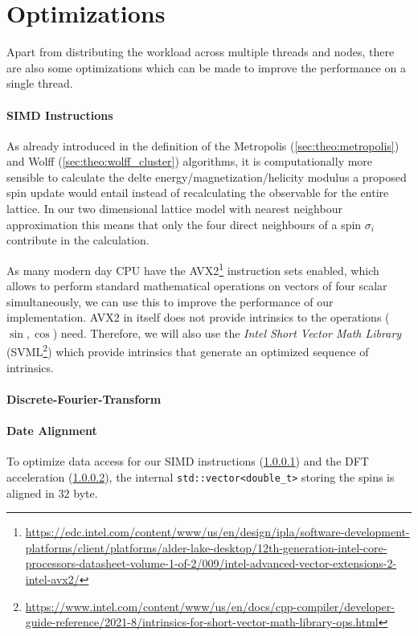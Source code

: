 \section{Optimizations}\label{sec:impl:optimizations}
	Apart from distributing the workload across multiple threads and nodes, there are also some optimizations which can be made to improve the performance on a single thread.
	
	\paragraph{SIMD Instructions}\label{sec:impl:optimizations:simd}
		As already introduced in the definition of the Metropolis (\cref{sec:theo:metropolis}) and Wolff (\cref{sec:theo:wolff_cluster}) algorithms, it is computationally more sensible to calculate the delte energy/magnetization/helicity modulus a proposed spin update would entail instead of recalculating the observable for the entire lattice. In our two dimensional lattice model with nearest neighbour approximation this means that only the four direct neighbours of a spin $\sigma_i$ contribute in the calculation.
			
		As many modern day CPU have the AVX2\footnote{\url{https://edc.intel.com/content/www/us/en/design/ipla/software-development-platforms/client/platforms/alder-lake-desktop/12th-generation-intel-core-processors-datasheet-volume-1-of-2/009/intel-advanced-vector-extensions-2-intel-avx2/}} instruction sets enabled, which allows to perform standard mathematical operations on vectors of four scalar simultaneously, we can use this to improve the performance of our implementation. AVX2 in itself does not provide intrinsics to the operations ($\sin, \cos$) need. Therefore, we will also use the \emph{Intel\textsuperscript{\tiny\textregistered} Short Vector Math Library} (SVML\footnote{\url{https://www.intel.com/content/www/us/en/docs/cpp-compiler/developer-guide-reference/2021-8/intrinsics-for-short-vector-math-library-ops.html}}) which provide intrinsics that generate an optimized sequence of intrinsics.

	\paragraph{Discrete-Fourier-Transform}\label{sec:impl:optimizations:dft}
		
		
	\paragraph{Date Alignment}
		To optimize data access for our SIMD instructions (\cref{sec:impl:optimizations:simd}) and the DFT acceleration (\cref{sec:impl:optimizations:dft}), the internal \texttt{std::vector<double_t>} storing the spins is aligned in $32$ byte.
		

